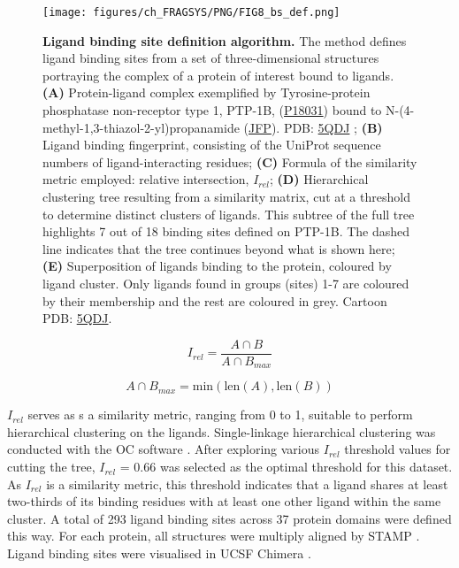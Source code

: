 \begin{figure}[htb!]
    \centering
    \texttt{[image: figures/ch\_FRAGSYS/PNG/FIG8\_bs\_def.png]}
    \caption[Ligand binding site definition algorithm]{\textbf{Ligand binding site definition algorithm.} The method defines ligand binding sites from a set of three-dimensional structures portraying the complex of a protein of interest bound to ligands. \textbf{(A)} Protein-ligand complex exemplified by Tyrosine-protein phosphatase non-receptor type 1, PTP-1B, (\href{https://www.uniprot.org/uniprotkb/P18031/entry}{P18031}) bound to N-(4-methyl-1,3-thiazol-2-yl)propanamide (\href{https://www.ebi.ac.uk/pdbe-srv/pdbechem/chemicalCompound/show/JFP}{JFP}). PDB: \href{https://www.ebi.ac.uk/pdbe/entry/pdb/5qdj}{5QDJ} \cite{KEEDY_2018_PTP1B}; \textbf{(B)} Ligand binding fingerprint, consisting of the UniProt sequence numbers of ligand-interacting residues; \textbf{(C)} Formula of the similarity metric employed: relative intersection, $I_{rel}$; \textbf{(D)} Hierarchical clustering tree resulting from a similarity matrix, cut at a threshold to determine distinct clusters of ligands. This subtree of the full tree highlights 7 out of 18 binding sites defined on PTP-1B. The dashed line indicates that the tree continues beyond what is shown here; \textbf{(E)} Superposition of ligands binding to the protein, coloured by ligand cluster. Only ligands found in groups (sites) 1-7 are coloured by their membership and the rest are coloured in grey. Cartoon PDB: \href{https://www.ebi.ac.uk/pdbe/entry/pdb/5qdj}{5QDJ}.}
    \label{fig:fragsys_bs_def}
\end{figure}

\begin{equation}
    I_{rel} = \frac{A \cap B}{A \cap B_{max}}
\label{eq:relative_intersection} %
\end{equation}

\vspace{-35pt} %

\begin{equation}
    A \cap B_{max} = \text{min}(\text{len}(A), \text{len}(B))
\label{eq:max_intersection}
\end{equation}
\vspace{-21pt} %

$I_{rel}$ serves as s a similarity metric, ranging from 0 to 1, suitable to perform hierarchical clustering on the ligands. Single-linkage hierarchical clustering was conducted with the OC software \cite{BARTON_1993_OC}. After exploring various $I_{rel}$ threshold values for cutting the tree, $I_{rel}$ = 0.66 was selected as the optimal threshold for this dataset. As $I_{rel}$ is a similarity metric, this threshold indicates that a ligand shares at least two-thirds of its binding residues with at least one other ligand within the same cluster. A total of 293 ligand binding sites across 37 protein domains were defined this way. For each protein, all structures were multiply aligned by STAMP \cite{RUSSELL_1992_STAMP}. Ligand binding sites were visualised in UCSF Chimera \cite{PETTERSEN_2004_CHIMERA}.

